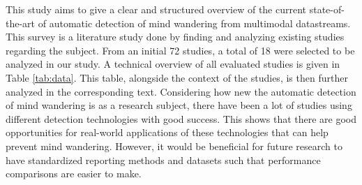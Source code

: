 This study aims to give a clear and structured overview of the current state-of-the-art of automatic detection of mind wandering from multimodal datastreams. This survey is a literature study done by finding and analyzing existing studies regarding the subject. From an initial 72 studies, a total of 18 were selected to be analyzed in our study. A technical overview of all evaluated studies is given in Table \ref{tab:data}. This table, alongside the context of the studies, is then further analyzed in the corresponding text. Considering how new the automatic detection of mind wandering is as a research subject, there have been a lot of studies using different detection technologies with good success. This shows that there are good opportunities for real-world applications of these technologies that can help prevent mind wandering. However, it would be beneficial for future research to have standardized reporting methods and datasets such that performance comparisons are easier to make.